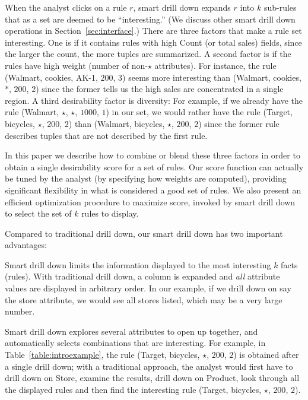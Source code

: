 \begin{example}
When the analyst clicks on a rule $r$, smart drill down
expands $r$ into $k$ sub-rules that as a set are deemed to be ``interesting.''
(We discuss other smart drill down operations in Section~\ref{sec:interface}.)
There are three factors that make a rule set interesting.
One is if it contains rules with high Count (or total sales) fields,
since the larger the count, the more tuples are summarized.
A second factor is if the rules have high weight (number of non-$\star$ attributes).
For instance, the rule (Walmart, cookies, AK-1, $200$, $3$)
seems more interesting than (Walmart, cookies, $*$, $200$, $2$)
since the former tells us the high sales are concentrated in a single region.
A third desirability factor is diversity:
For example, if we already have the rule (Walmart, $\star$, $\star$, $1000$, $1$)
in our set, we would rather have the rule (Target, bicycles, $\star$, $200$, $2$)
than (Walmart, bicycles, $\star$, $200$, $2$) since the former rule
describes tuples that are not described by the first rule.

In this paper we describe how to combine or blend these three factors
in order to obtain a single desirability score for a set of rules.
Our score function can actually be tuned by the analyst
(by specifying how weights are computed),
providing significant flexibility in what is considered a good set of rules.
We also present an efficient optimization procedure to maximize score, invoked
by smart drill down to select the set of $k$ rules to display.

\end{example}

Compared to traditional drill down, our smart drill down has two important advantages:
\squishlist
\item
Smart drill down limits the information displayed
to the most interesting $k$ facts (rules).
With traditional drill down, a column is expanded and {\em all}
attribute values are displayed in arbitrary order.
In our example, if we drill down on say the store attribute,
we would see all stores listed, which may be a very large number.
\item
Smart drill down explores several attributes to open up together,
and automatically selects combinations that are interesting.
For example, in Table~\ref{table:introexample},
the rule (Target, bicycles, $\star$, $200$, $2$)
is obtained after a single drill down;
with a traditional approach, the analyst would first have to drill down on
Store, examine the results, drill down on Product,
look through all the displayed rules and then find the interesting rule
(Target, bicycles, $\star$, $200$, $2$).
\squishend

